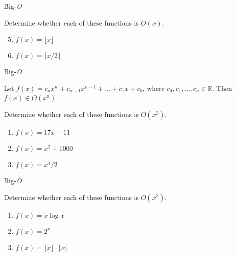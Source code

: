 \documentclass{beamer}
\begin{document}
\begin{frame}[t]{Big-\textit{O}}
    \begin{example}
        Determine whether each of these functions is $\textit{O}(x)$.
        \begin{enumerate}
            \setcounter{enumi}{4}
            \item $f(x) = \lfloor x \rfloor$
            \vspace{20mm}
            \item $f(x) = \lceil x/2 \rceil$
            \vspace{22mm}
        \end{enumerate}
    \end{example}
\end{frame}

\begin{frame}[t]{Big-\textit{O}}
    \begin{theorem}
        Let $f(x) = c_nx^n + c_{n-1}x^{n-1} + \dots + c_1x + c_0$, where $c_0, c_1, \dots, c_n \in \mathbb{R}$. Then $f(x) \in O(x^n)$.  
    \end{theorem}
    \begin{example}
        Determine whether each of these functions is $O(x^2)$.
        \begin{enumerate}
            \item $f(x) = 17x + 11$
            \item $f(x) = x^2 + 1000$
            \item $f(x) = x^4/2$
        \end{enumerate}
    \end{example}
\end{frame}

\begin{frame}[t]{Big-\textit{O}}
    \begin{example}
        Determine whether each of these functions is $O(x^2)$.
        \begin{enumerate}
            \item $f(x) = x\log{x}$
            \vspace{12mm}
            \item $f(x) = 2^x$
            \vspace{12mm}
            \item $f(x) = \lfloor x \rfloor \cdot \lceil x \rceil$
            \vspace{14mm}
        \end{enumerate}
    \end{example}
\end{frame}
\end{document}
